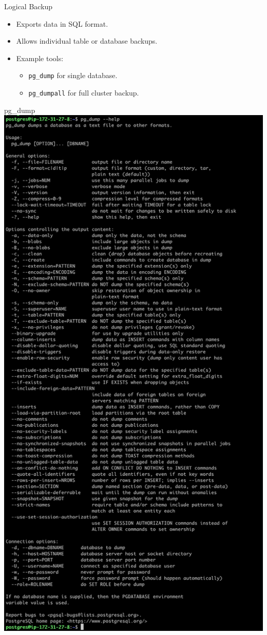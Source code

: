 \documentclass[aspectratio=169]{beamer}
\begin{document}
\begin{frame}{Logical Backup}
    \begin{itemize}
        \item Exports data in SQL format.
        \item Allows individual table or database backups.
        \item Example tools:
        \begin{itemize}
            \item \texttt{pg\_dump} for single database.
            \item \texttt{pg\_dumpall} for full cluster backup.
        \end{itemize}
    \end{itemize}
\end{frame}

\begin{frame}{pg\_dump}
    \centering
    \includegraphics[width=\textwidth, trim={0cm 57.5cm 0cm 0.2cm}, clip]{figures/pg_dump}

\end{frame}
\end{document}
